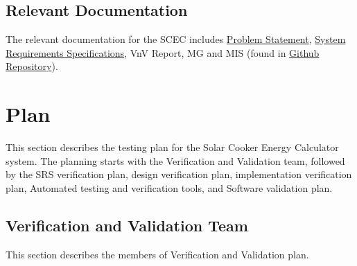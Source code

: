 \documentclass[12pt, titlepage]{article}
\begin{document}
\subsection{Relevant Documentation}

The relevant documentation for the SCEC includes \href{https://github.com/DeeshaPatel/CAS-741-Solar-Cooker/blob/7c53c8d9a19ca2f94dfba6ba9208eae0bf03b8cc/docs/ProblemStatementAndGoals/ProblemStatement.pdf}{Problem Statement}, \href{https://github.com/DeeshaPatel/CAS-741-Solar-Cooker/blob/7c53c8d9a19ca2f94dfba6ba9208eae0bf03b8cc/docs/SRS/SRS.pdf}{System Requirements Specifications}, VnV Report, MG and MIS (found in \href{https://github.com/DeeshaPatel/CAS-741-Solar-Cooker/tree/main/docs}{Github Repository}).  


\section{Plan}
\label{plan}

This section describes the testing plan for the Solar Cooker Energy Calculator system. The planning starts with the Verification and Validation team, followed by the SRS verification plan, design verification plan, implementation verification plan, Automated testing and verification tools, and Software validation plan.  

\subsection{Verification and Validation Team}

This section describes the members of Verification and Validation plan. 

\begin{center}
\begin{table}[h!]
\caption{Verification and Validation team} 
\label{verification_validation}
\end{table}
\end{center}
\end{document}
